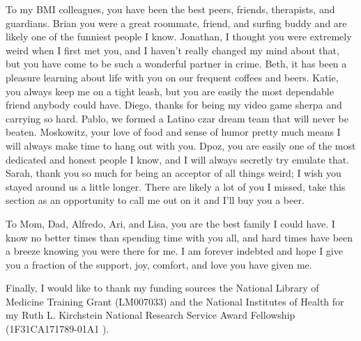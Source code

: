 To my BMI colleagues, you have been the best peers, friends, therapists, and guardians. Brian you were a great roommate, friend, and surfing buddy and are likely one of the funniest people I know. Jonathan, I thought you were extremely weird when I first met you, and I haven't really changed my mind about that, but you have come to be such a wonderful partner in crime. Beth, it has been a pleasure learning about life with you on our frequent coffees and beers. Katie, you always keep me on a tight leash, but you are easily the most dependable friend anybody could have. Diego, thanks for being my video game sherpa and carrying so hard. Pablo, we formed a Latino czar dream team that will never be beaten. Moskowitz, your love of food and sense of humor pretty much means I will always make time to hang out with you. Dpoz, you are easily one of the most dedicated and honest people I know, and I will always secretly try emulate that. Sarah, thank you so much for being an acceptor of all things weird; I wish you stayed around us a little longer. There are likely a lot of you I missed, take this section as an opportunity to call me out on it and I'll buy you a beer.

To Mom, Dad, Alfredo, Ari, and Lisa, you are the best family I could have. I know no better times than spending time with you all, and hard times have been a breeze knowing you were there for me. I am forever indebted and hope I give you a fraction of the support, joy, comfort, and love you have given me.

Finally, I would like to thank my funding sources the National Library of Medicine Training Grant (LM007033) and the National Institutes of Health for my Ruth L. Kirchstein National Research Service Award Fellowship (1F31CA171789-01A1 ). 
